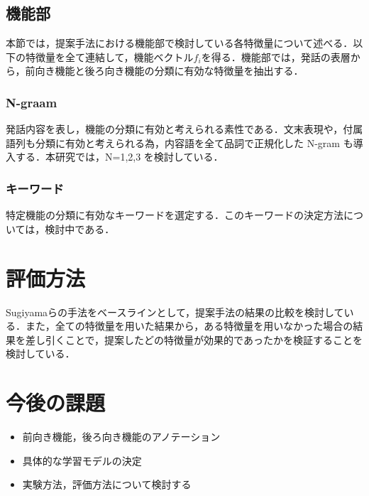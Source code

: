 \documentclass[upLaTex, 10pt,dvipdfmx,a4paper,twocolumn]{jsarticle}
\begin{document}
    \subsection{機能部}
    本節では，提案手法における機能部で検討している各特徴量について述べる．以下の特徴量を全て連結して，機能ベクトル$f_i$を得る．機能部では，発話の表層から，前向き機能と後ろ向き機能の分類に有効な特徴量を抽出する．
    \subsubsection{N-graam}
        発話内容を表し，機能の分類に有効と考えられる素性である．文末表現や，付属語列も分類に有効と考えられる為，内容語を全て品詞で正規化した N-gram も導入する．本研究では，N=1,2,3 を検討している．
    \subsubsection{キーワード}
        特定機能の分類に有効なキーワードを選定する．このキーワードの決定方法については，検討中である．


\section{評価方法}
    Sugiyamaらの手法をベースラインとして，提案手法の結果の比較を検討している．また，全ての特徴量を用いた結果から，ある特徴量を用いなかった場合の結果を差し引くことで，提案したどの特徴量が効果的であったかを検証することを検討している．

\section{今後の課題}
 \begin{itemize}
     \item 前向き機能，後ろ向き機能のアノテーション
     \item 具体的な学習モデルの決定
     \item 実験方法，評価方法について検討する
 \end{itemize} 
\end{document}

